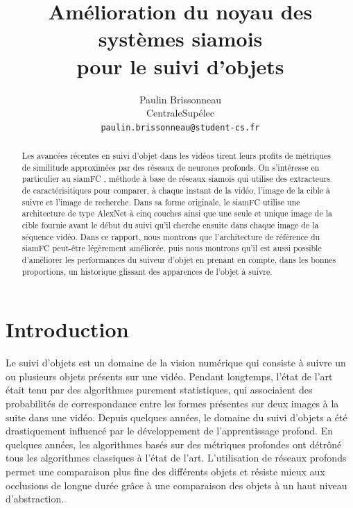 \documentclass[10pt,twocolumn,letterpaper,french]{article}
\begin{document}
\title{Amélioration du noyau des systèmes siamois\\pour le suivi d'objets}

\author{Paulin Brissonneau\\
CentraleSupélec\\
{\tt\small paulin.brissonneau@student-cs.fr}}



\maketitle

\begin{abstract}

Les avancées récentes en suivi d'objet dans les vidéos tirent leurs profits de métriques de similitude approximées par des réseaux de neurones profonds. On s'intéresse en particulier au siamFC \cite{siamfc}, méthode à base de réseaux siamois qui utilise des extracteurs de caractérisitiques pour comparer, à chaque instant de la vidéo, l'image de la cible à suivre et l'image de recherche. Dans sa forme originale, le siamFC utilise une architecture de type AlexNet à cinq couches ainsi que une seule et unique image de la cible fournie avant le début du suivi qu'il cherche ensuite dans chaque image de la séquence vidéo. Dans ce rapport, nous montrons que l'architecture de référence du siamFC peut-être légèrement améliorée, puis nous montrons qu'il est aussi possible d'améliorer les performances du suiveur d'objet en prenant en compte, dans les bonnes proportions, un historique glissant des apparences de l'objet à suivre.

\end{abstract}

\section*{Introduction}

Le suivi d'objets est un domaine de la vision numérique qui consiste à suivre un ou plusieurs objets présents sur une vidéo.
   Pendant longtemps, l'état de l'art était tenu par des algorithmes purement statistiques, qui associaient des probabilités de correspondance entre les formes présentes sur deux images à la suite dans une vidéo. Depuis quelques années, le domaine du suivi d'objets a été drastiquement influencé par le développement de l'apprentissage profond. En quelques années, les algorithmes basés sur des métriques profondes ont détrôné tous les algorithmes classiques à l'état de l'art. L'utilisation de réseaux profonds permet une comparaison plus fine des différents objets et résiste mieux aux occlusions de longue durée grâce à une comparaison des objets à un haut niveau d'abstraction. \\
   
\end{document}
